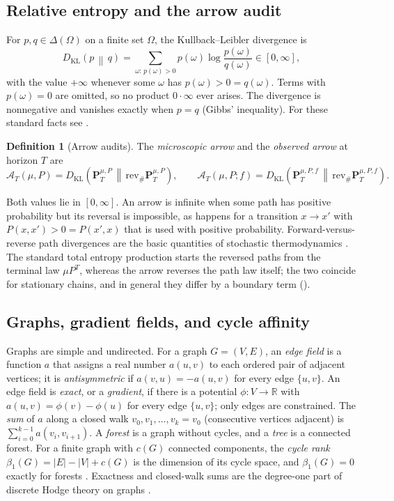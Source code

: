 \documentclass[11pt]{article}
\theoremstyle{definition}
\newtheorem{definition}{Definition}[section]
\newcommand{\rev}{\mathrm{rev}}
\newcommand{\1}{\mathbf{1}}
\newcommand{\DKL}[2]{D_{\mathrm{KL}}\!\left(#1\,\middle\|\,#2\right)}
\newcommand{\Arr}{\mathcal{A}}
\begin{document}
\subsection{Relative entropy and the arrow audit}
For $p,q\in\Delta(\Omega)$ on a finite set $\Omega$, the Kullback--Leibler divergence is
\[
  \DKL{p}{q}=\sum_{\omega:\,p(\omega)>0}p(\omega)\log\frac{p(\omega)}{q(\omega)}\in[0,\infty],
\]
with the value $+\infty$ whenever some $\omega$ has $p(\omega)>0=q(\omega)$.
Terms with $p(\omega)=0$ are omitted, so no product $0\cdot\infty$ ever arises.
The divergence is nonnegative and vanishes exactly when $p=q$ (Gibbs' inequality).
For these standard facts see \citep{KullbackLeibler1951,CoverThomas2006}.

\begin{definition}[Arrow audits]\label{def:arrow}
The \emph{microscopic arrow} and the \emph{observed arrow} at horizon $T$ are
\[
  \Arr_T(\mu,P)=\DKL{\mathbf{P}^{\mu,P}_T}{\rev_{\#}\mathbf{P}^{\mu,P}_T},
  \qquad
  \Arr_T(\mu,P;f)=\DKL{\mathbf{P}^{\mu,P,f}_T}{\rev_{\#}\mathbf{P}^{\mu,P,f}_T}.
\]
\end{definition}

Both values lie in $[0,\infty]$.
An arrow is infinite when some path has positive probability but its reversal is impossible, as happens for a transition $x\to x'$ with $P(x,x')>0=P(x',x)$ that is used with positive probability.
Forward-versus-reverse path divergences are the basic quantities of stochastic thermodynamics \citep{Seifert2012,MaesNetocny2003}.
The standard total entropy production starts the reversed paths from the terminal law $\mu P^T$, whereas the arrow reverses the path law itself; the two coincide for stationary chains, and in general they differ by a boundary term ().

\subsection{Graphs, gradient fields, and cycle affinity}
Graphs are simple and undirected.
For a graph $G=(V,E)$, an \emph{edge field} is a function $a$ that assigns a real number $a(u,v)$ to each ordered pair of adjacent vertices; it is \emph{antisymmetric} if $a(v,u)=-a(u,v)$ for every edge $\{u,v\}$.
An edge field is \emph{exact}, or a \emph{gradient}, if there is a potential $\phi:V\to\mathbb{R}$ with $a(u,v)=\phi(v)-\phi(u)$ for every edge $\{u,v\}$; only edges are constrained.
The \emph{sum} of $a$ along a closed walk $v_0,v_1,\dots,v_k=v_0$ (consecutive vertices adjacent) is $\sum_{i=0}^{k-1}a(v_i,v_{i+1})$.
A \emph{forest} is a graph without cycles, and a \emph{tree} is a connected forest.
For a finite graph with $c(G)$ connected components, the \emph{cycle rank} $\beta_1(G)=|E|-|V|+c(G)$ is the dimension of its cycle space, and $\beta_1(G)=0$ exactly for forests \citep{Diestel2017,Biggs1993}.
Exactness and closed-walk sums are the degree-one part of discrete Hodge theory on graphs \citep{Lim2020Hodge}.
\end{document}
